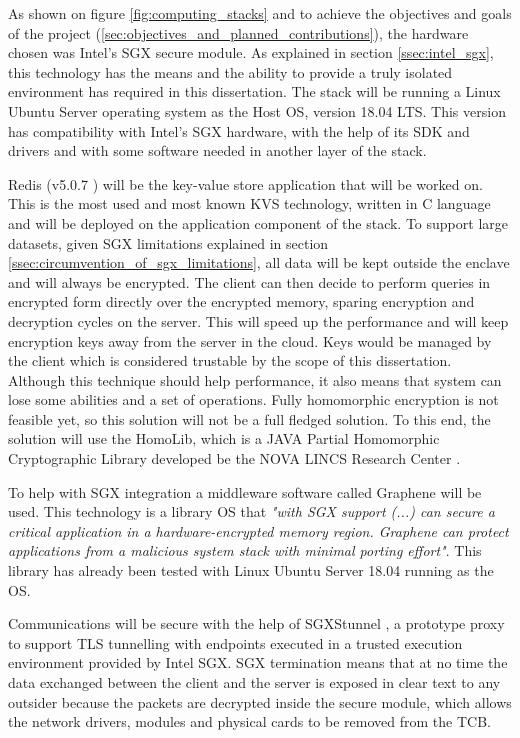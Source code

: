 As shown on figure \ref{fig:computing_stacks} and to achieve the objectives and goals of the project (\ref{sec:objectives_and_planned_contributions}), the hardware chosen was Intel's \gls{SGX} secure module. As explained in section \ref{ssec:intel_sgx}, this technology has the means and the ability to provide a truly isolated environment has required in this dissertation. The stack will be running a Linux Ubuntu Server \cite{ubuntu_server:1} operating system as the Host \gls{OS}, version 18.04 LTS. This version has compatibility with Intel's \gls{SGX} hardware, with the help of its \gls{SDK} and drivers \cite{sgx_sdk:1, sgx_drivers:1} and with some software needed in another layer of the stack.

Redis (v5.0.7 \cite{redis:1}) will be the key-value store application that will be worked on. This is the most used and most known \gls{KVS} technology, written in C language and will be deployed on the application component of the stack. To support large datasets, given \gls{SGX} limitations explained in section \ref{ssec:circumvention_of_sgx_limitations}, all data will be kept outside the enclave and will always be encrypted. The client can then decide to perform queries in encrypted form directly over the encrypted memory, sparing encryption and decryption cycles on the server. This will speed up the performance and will keep encryption keys away from the server in the cloud. Keys would be managed by the client which is considered trustable by the scope of this dissertation. Although this technique should help performance, it also means that system can lose some abilities and a set of operations. Fully homomorphic encryption is not feasible yet, so this solution will not be a full fledged solution. To this end, the solution will use the HomoLib, which is a JAVA Partial Homomorphic Cryptographic Library developed be the NOVA LINCS Research Center \cite{homolib:1}.

To help with \gls{SGX} integration a middleware software called Graphene \cite{graphene:1, graphene:2} will be used. This technology is a library \gls{OS} that \textit{"with \gls{SGX} support (...) can secure a critical application in a hardware-encrypted memory region. Graphene can protect applications from a malicious system stack with minimal porting effort"}. This library has already been tested with Linux Ubuntu Server 18.04 running as the \gls{OS}. 

Communications will be secure with the help of SGXStunnel \cite{sgxstunnel:1}, a prototype proxy to support TLS tunnelling with endpoints executed in a trusted execution environment provided by Intel SGX. \gls{SGX} termination means that at no time the data exchanged between the client and the server is exposed in clear text to any outsider because the packets are decrypted inside the secure module, which allows the network drivers, modules and physical cards to be removed from the \gls{TCB}.

